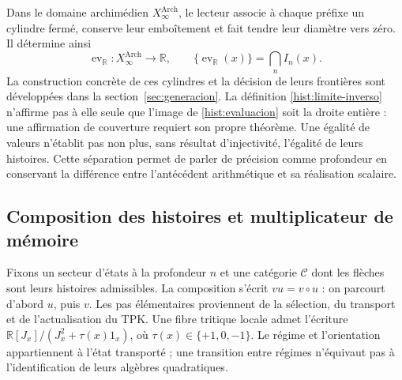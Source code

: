 Dans le domaine archimédien \(X_\infty^{\mathrm{Arch}}\), le lecteur associe
à chaque préfixe un cylindre fermé, conserve leur emboîtement et fait tendre
leur diamètre vers zéro. Il détermine ainsi
\begin{equation}
 \operatorname{ev}_{\mathbb R}:X_\infty^{\mathrm{Arch}}\longrightarrow
 \mathbb R,\qquad
 \{\operatorname{ev}_{\mathbb R}(x)\}=\bigcap_n I_n(x).
 \label{hist:evaluacion}
\end{equation}
La construction concrète de ces cylindres et la décision de leurs frontières
sont développées dans la section~\ref{sec:generacion}. La définition
\eqref{hist:limite-inverso} n’affirme pas à elle seule que l’image de
\eqref{hist:evaluacion} soit la droite entière : une affirmation de couverture
requiert son propre théorème. Une égalité de valeurs n’établit pas non plus, sans
résultat d’injectivité, l’égalité de leurs histoires. Cette séparation
permet de parler de précision comme profondeur en conservant la différence
entre l’antécédent arithmétique et sa réalisation scalaire.

\subsection{Composition des histoires et multiplicateur de mémoire}
\label{hist:algebra}

Fixons un secteur d’états à la profondeur \(n\) et une catégorie
\(\mathcal C\) dont les flèches sont leurs histoires admissibles. La composition
s’écrit \(vu=v\circ u\) : on parcourt d’abord \(u\), puis \(v\).
Les pas élémentaires proviennent de la sélection, du transport et de
l’actualisation du TPK. Une fibre tritique locale admet l’écriture
\(\mathbb R[J_x]/(J_x^2+\tau(x)1_x)\), où
\(\tau(x)\in\{+1,0,-1\}\). Le régime et l’orientation appartiennent à
l’état transporté ; une transition entre régimes n’équivaut pas à
l’identification de leurs algèbres quadratiques.

